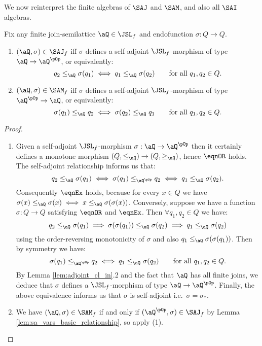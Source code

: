 \documentclass{article}
\begin{document}
We now reinterpret the finite algebras of $\SAJ$ and $\SAM$, and also all $\SAI$ algebras.

\smallskip

\begin{lemma}
\label{lem:interpret_finite_saj_sam}
\item
Fix any finite join-semilattice $\aQ \in \JSL_f$ and endofunction $\sigma : Q \to Q$.
\begin{enumerate}
\item
$(\aQ,\sigma) \in \SAJ_f$ iff $\sigma$ defines a self-adjoint $\JSL_f$-morphism of type $\aQ \to \aQ^{\pOp}$, or equivalently:
\[
q_2 \leq_\aQ \sigma(q_1) \iff q_1 \leq_\aQ \sigma(q_2)
\qquad
\text{for all $q_1,q_2 \in Q$}.
\]

\item
$(\aQ,\sigma) \in \SAM_f$ iff $\sigma$ defines a self-adjoint $\JSL_f$-morphism of type $\aQ^{\pOp} \to \aQ$, or equivalently:
\[
\sigma(q_1) \leq_\aQ q_2 \iff \sigma(q_2) \leq_\aQ q_1
\qquad
\text{for all $q_1,q_2 \in Q$}.
\]
\end{enumerate}
\end{lemma}

\begin{proof}
\item
\begin{enumerate}
\item
Given a self-adjoint $\JSL_f$-morphism $\sigma : \aQ \to \aQ^{\pOp}$ then it certainly defines a monotone morphism $(Q,\leq_\aQ) \to (Q,\geq_\aQ)$, hence $\eqnOR$ holds. The self-adjoint relationship informs us that:
\[
q_2 \leq_\aQ \sigma(q_1)
\iff \sigma(q_1) \leq_{\aQ^{\pOp}} q_2
\iff q_1 \leq_\aQ \sigma(q_2).
\]
Consequently $\eqnEx$ holds, because for every $x \in Q$ we have $\sigma(x) \leq_\aQ \sigma(x) \iff x \leq_\aQ \sigma(\sigma(x))$. Conversely, suppose we have a function $\sigma : Q \to Q$ satisfying $\eqnOR$ and $\eqnEx$. Then $\forall q_1, q_2 \in Q$ we have:
\[
q_2 \leq_\aQ \sigma(q_1)
\implies
\sigma(\sigma(q_1)) \leq_\aQ \sigma(q_2)
\implies
q_1 \leq_\aQ \sigma(q_2)
\]
using the order-reversing monotonicity of $\sigma$ and also $q_1 \leq_\aQ \sigma(\sigma(q_1))$. Then by symmetry we have:
\[
\sigma(q_1) \leq_{\aQ^{\pOp}} q_2 \iff q_1 \leq_\aQ \sigma(q_2)
\qquad
\text{for all $q_1, q_2 \in Q$}.
\]
By Lemma \ref{lem:adjoint_cl_in}.2 and the fact that $\aQ$ has all finite joins, we deduce that $\sigma$ defines a $\JSL_f$-morphism of type $\aQ \to \aQ^{\pOp}$. Finally, the above equivalence informs us that $\sigma$ is self-adjoint i.e.\ $\sigma = \sigma_*$.

\item
We have $(\aQ,\sigma) \in \SAM_f$ if and only if $(\aQ^{\pOp},\sigma) \in \SAJ_f$ by Lemma \ref{lem:sa_vars_basic_relationship}, so apply (1).


\end{enumerate}
\end{proof}
\end{document}
